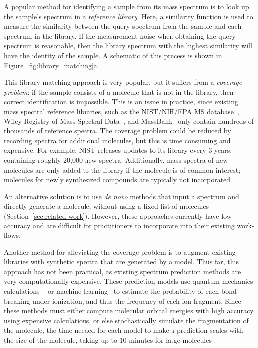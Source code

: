 \documentclass{article}
\begin{document}
A popular method for identifying a sample from its mass spectrum is to look up the sample's spectrum in a \textit{reference library}. Here, a similarity function is used to measure the similarity between the query spectrum from the sample and each spectrum in the library. If the measurement noise when obtaining the query spectrum is reasonable, then the library spectrum with the highest similarity will have the identity of the sample.\cite{stein1995ChemicalSubstructureIdentification,stein1994optimization} A schematic of this process is shown in Figure~\ref{fig:library_matching}a.

This library matching approach is very popular, but it suffers from a \textit{coverage problem}: if the sample consists of a molecule that is not in the library, then correct identification is impossible. This is an issue in practice, since existing mass spectral reference libraries, such as the NIST/NIH/EPA MS database~\cite{2017nist}, Wiley Registry of Mass Spectral Data~\cite{mclafferty2016wiley}, and MassBank~\cite{horai2010massbank} only contain hundreds of thousands of reference spectra. The coverage problem could be reduced by recording spectra for additional molecules, but this is time consuming and expensive. For example, NIST releases updates to its library every 3 years, containing roughly 20,000 new spectra. Additionally, mass spectra of new molecules are only added to the library if the molecule is of common interest; molecules for newly synthesized compounds are typically not incorporated~ \cite{2017nist,stein2012MassLibReview}.

An alternative solution is to use \textit{de novo} methods that input a spectrum and directly generate a molecule, without using a fixed list of molecules (Section~\ref{sec:related-work}). However, these approaches currently have low-accuracy and are difficult for practitioners to incorporate into their existing work-flows.

Another method for alleviating the coverage problem is to augment existing libraries with synthetic spectra that are generated by a model. Thus far, this approach has not been practical, as existing spectrum prediction methods are very computationally expensive. These prediction models use quantum mechanics calculations ~\cite{bauer2016compute,grimme2013towards,Guerra_BEB_model} or machine learning~\cite{allen2016computational} to estimate the probability of each bond breaking under ionization, and thus the frequency of each ion fragment. Since these methods must either compute molecular orbital energies with high accuracy using expensive calculations, or else stochastically simulate the fragmentation of the molecule, the time needed for each model to make a prediction scales with the size of the molecule, taking up to 10 minutes for large molecules \cite{bauer2016compute,allen2016computational}.
\end{document}
